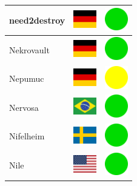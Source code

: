 \documentclass[12pt, a4paper, twoside]{report}
\begin{document}
\begin{center}
\begin{longtable}{|p{5cm}|p{2cm}|p{2cm}|}
			need2destroy & \includegraphics[width=1cm]{4x3/de} & \includegraphics[width=1cm]{likes/y} \\ \hline
			Nekrovault & \includegraphics[width=1cm]{4x3/de} & \includegraphics[width=1cm]{likes/y} \\ \hline
			Nepumuc & \includegraphics[width=1cm]{4x3/de} & \includegraphics[width=1cm]{likes/m} \\ \hline
			Nervosa & \includegraphics[width=1cm]{4x3/br} & \includegraphics[width=1cm]{likes/y} \\ \hline
			Nifelheim & \includegraphics[width=1cm]{4x3/se} & \includegraphics[width=1cm]{likes/y} \\ \hline
			Nile & \includegraphics[width=1cm]{4x3/us} & \includegraphics[width=1cm]{likes/y} \\ \hline

\end{longtable}
\end{center}
\end{document}
